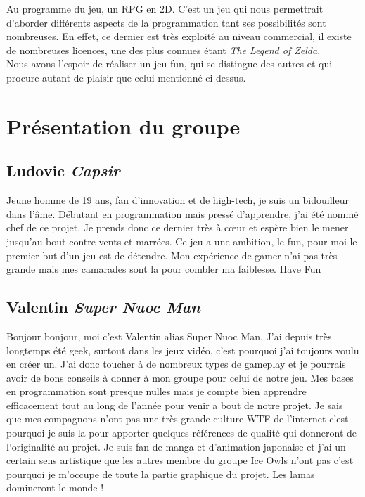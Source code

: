 \documentclass[12pt,a4paper]{article}
\begin{document}
Au programme du jeu, un RPG en 2D. C'est un jeu qui nous permettrait d'aborder différents aspects de la programmation tant ses possibilités sont nombreuses. En effet, ce dernier est très exploité au niveau commercial, il existe de nombreuses licences, une des plus connues étant \textit{The Legend of Zelda}.\\

Nous avons l'espoir de réaliser un jeu fun, qui se distingue des autres et qui procure autant de plaisir que celui mentionné ci-dessus.\\

\newpage
\section{Présentation du groupe}
 
  \subsection{Ludovic \textit{Capsir} }
Jeune homme de 19 ans, fan d'innovation et de high-tech, je suis un bidouilleur dans l'âme. Débutant en programmation mais pressé d'apprendre, j'ai été nommé chef de ce projet. Je prends donc ce dernier très à cœur et espère bien le mener jusqu'au bout contre vents et marrées. Ce jeu a une ambition, le fun, pour moi le premier but d'un jeu est de détendre. Mon expérience de gamer n'ai pas très grande mais mes camarades sont la pour combler ma faiblesse. Have Fun


  \subsection{Valentin \textit{Super Nuoc Man}}

Bonjour bonjour, moi c'est Valentin alias Super Nuoc Man. J'ai depuis très longtemps été geek,  surtout dans les jeux vidéo, c'est pourquoi j'ai toujours voulu en créer un. J'ai donc toucher à de nombreux types de gameplay et je pourrais avoir de bons conseils à donner à mon groupe pour celui de notre jeu.
Mes bases en programmation sont presque nulles mais je compte bien apprendre efficacement tout au long de l'année pour venir a bout de notre projet.
Je sais que mes compagnons n'ont pas une très grande culture WTF de l'internet c'est pourquoi je suis la pour apporter quelques références de qualité qui donneront de l‘originalité au projet.
Je suis fan de manga et d'animation japonaise et j'ai un certain sens artistique que les autres membre du groupe Ice Owls n'ont pas c'est pourquoi je m'occupe de toute la partie graphique du projet.
Les lamas domineront le monde !
\end{document}
